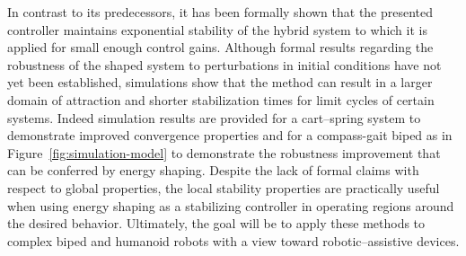 \documentclass[english]{article}
\begin{document}
% 
% 
% 


In contrast to its predecessors, it has been formally shown that the presented
controller maintains exponential stability of the hybrid system to which it is
applied for small enough control gains.
%
Although formal results regarding the robustness of the shaped system to
perturbations in initial conditions have not yet been established, simulations
show that the method can result in a larger domain of attraction and shorter
stabilization times for limit cycles of certain systems.
%
Indeed simulation results are provided for a cart--spring system to demonstrate
improved convergence properties and for a compass-gait
biped as in Figure~\ref{fig:simulation-model} to
demonstrate the robustness improvement that can be conferred by energy shaping.
%
Despite the lack of formal claims with respect to global properties, the local
stability properties are practically useful when using energy shaping as a
stabilizing controller in operating regions around the desired behavior.
%
Ultimately, the goal will be to apply these methods to complex biped and
humanoid robots with a view toward robotic--assistive devices.
\end{document}
